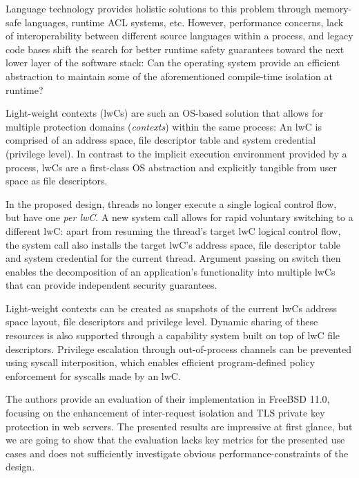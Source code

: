 \documentclass[10pt,twocolumn,a4paper]{article}
\begin{document}
Language technology provides holistic solutions to this problem through memory-safe languages, runtime ACL systems, etc.
However, performance concerns, lack of interoperability between different source languages within a process, and legacy code bases shift the search for better runtime safety guarantees toward the next lower layer of the software stack:
Can the operating system provide an efficient abstraction to maintain some of the aforementioned compile-time isolation at runtime?

Light-weight contexts (lwCs) are such an OS-based solution that allows for multiple protection domains (\textit{contexts}) within the same process:
An lwC is comprised of an address space, file descriptor table and system credential (privilege level).
In contrast to the implicit execution environment provided by a process, lwCs are a first-class OS abstraction and explicitly tangible from user space as file descriptors.
\cite{lwcpaper}

In the proposed design, threads no longer execute a single logical control flow, but have one \textit{per lwC}.
A new system call allows for rapid voluntary switching to a different lwC: apart from resuming the thread's target lwC logical control flow, the system call also installs the target lwC's address space, file descriptor table and system credential for the current thread.
Argument passing on switch then enables the decomposition of an application's functionality into multiple lwCs that can provide independent security guarantees.
\cite{lwcpaper}

Light-weight contexts can be created as snapshots of the current lwCs address space layout, file descriptors and privilege level.
Dynamic sharing of these resources is also supported through a capability system built on top of lwC file descriptors.
Privilege escalation through out-of-process channels can be prevented using syscall interposition, which enables efficient program-defined policy enforcement for syscalls made by an lwC.
\cite{lwcpaper}

The authors provide an evaluation of their implementation in FreeBSD 11.0, focusing on the enhancement of inter-request isolation and TLS private key protection in web servers.
The presented results are impressive at first glance, but we are going to show that the evaluation lacks key metrics for the presented use cases and does not sufficiently investigate obvious performance-constraints of the design.

\end{document}
